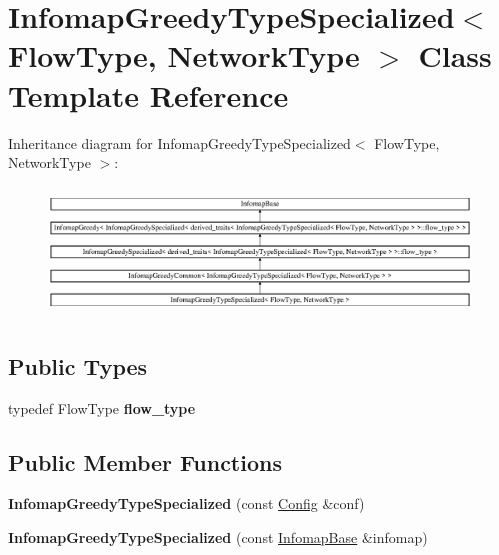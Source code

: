\hypertarget{classInfomapGreedyTypeSpecialized}{}\section{Infomap\+Greedy\+Type\+Specialized$<$ Flow\+Type, Network\+Type $>$ Class Template Reference}
\label{classInfomapGreedyTypeSpecialized}
Inheritance diagram for Infomap\+Greedy\+Type\+Specialized$<$ Flow\+Type, Network\+Type $>$\+:\begin{figure}[H]
\begin{center}
\leavevmode
\includegraphics[height=3.469641cm]{classInfomapGreedyTypeSpecialized}
\end{center}
\end{figure}
\subsection*{Public Types}
\begin{DoxyCompactItemize}
\item 
\mbox{\label{classInfomapGreedyTypeSpecialized_af6a39177ef2be9255e5896eff654fdb9}} 
typedef Flow\+Type {\bfseries flow\+\_\+type}
\end{DoxyCompactItemize}
\subsection*{Public Member Functions}
\begin{DoxyCompactItemize}
\item 
\mbox{\label{classInfomapGreedyTypeSpecialized_ab7f8b46d6fe3b9bf2373067085c3d924}} 
{\bfseries Infomap\+Greedy\+Type\+Specialized} (const \mbox{\hyperlink{structConfig}{Config}} \&conf)
\item 
\mbox{\label{classInfomapGreedyTypeSpecialized_ac69bbdc992611319c02e680896e2cd3e}} 
{\bfseries Infomap\+Greedy\+Type\+Specialized} (const \mbox{\hyperlink{classInfomapBase}{Infomap\+Base}} \&infomap)
\end{DoxyCompactItemize}
